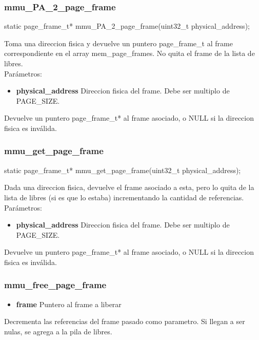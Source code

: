 \subsubsection{mmu\_PA\_2\_page\_frame}
\begin{verbatimtab}
static page_frame_t* mmu_PA_2_page_frame(uint32_t physical_address);
\end{verbatimtab}
Toma una direccion fisica y devuelve un puntero page\_frame\_t al frame correspondiente en el array 
mem\_page\_frames. No quita el frame de la lista de libres.\\
Parámetros:
\begin{itemize}
 \item \textbf{physical\_address} Direccion fisica del frame. Debe ser multiplo de PAGE\_SIZE.
\end{itemize}
Devuelve un puntero page\_frame\_t* al frame asociado, o NULL si la direccion fisica es inválida.

\subsubsection{ mmu\_get\_page\_frame}
\begin{verbatimtab}
static page_frame_t* mmu_get_page_frame(uint32_t physical_address);
\end{verbatimtab}
Dada una direccion fisica, devuelve el frame asociado a esta, pero lo quita de la lista de libres (si es que lo estaba) incrementando la cantidad de referencias.\\
Parámetros:
\begin{itemize}
 \item \textbf{physical\_address} Direccion fisica del frame. Debe ser multiplo de PAGE\_SIZE.
\end{itemize}
Devuelve un puntero page\_frame\_t* al frame asociado, o NULL si la direccion fisica es inválida.


\subsubsection{mmu\_free\_page\_frame}
\begin{itemize}
 \item \textbf{frame} Puntero al frame a liberar
\end{itemize}
Decrementa las referencias del frame pasado como parametro. Si llegan a ser nulas, se agrega a la pila de libres.


